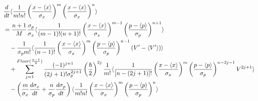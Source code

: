\begin{align*}
	&\frac{d}{dt}\langle \frac{1}{m!n!}\left(\frac{x-\langle x \rangle}{\sigma_x}\right)^m\left(\frac{x-\langle x \rangle}{\sigma_x}\right)^n \rangle\\
	&= \frac{n+1}{M}\frac{\sigma_p}{\sigma_x}\langle \frac{1}{(m-1)!(n+1)!}\left(\frac{x-\langle x \rangle}{\sigma_x}\right)^{m-1}\left(\frac{p-\langle p \rangle}{\sigma_p}\right)^{n+1} \rangle\\
	&\quad -\frac{1}{\sigma_p m!}\langle \frac{1}{(n-1)!}\left(\frac{x-\langle x \rangle}{\sigma_x}\right)^{m}\left(\frac{p-\langle p \rangle}{\sigma_p}\right)^{n-1}(V'-\langle V' \rangle) \rangle\\
	&\quad + \sum_{j=1}^{Floor(\frac{n-1}{2})}\frac{(-1)^{j+1}}{(2j+1)!\sigma_p^{2j+1}}\left(\frac{\hbar}{2}\right)^{2j}\frac{1}{m!}\langle \frac{1}{[n-(2j+1)]!}\left(\frac{x-\langle x \rangle}{\sigma_x}\right)^{m}\left(\frac{p-\langle p \rangle}{\sigma_p}\right)^{n-2j-1}V^{2j+1} \rangle\\
	&\quad - \left(\frac{m}{\sigma_x}\frac{d\sigma_x}{dt}+\frac{n}{\sigma_p}\frac{d\sigma_p}{dt}\right)\langle \frac{1}{m!n!}\left(\frac{x-\langle x \rangle}{\sigma_x}\right)^{m}\left(\frac{p-\langle p \rangle}{\sigma_p}\right)^{n} \rangle
	\end{align*}

